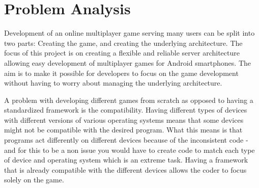 \chapter{Problem Analysis}


Development of an online multiplayer game serving many users can be split into two parts: Creating the game, and creating the underlying architecture. The focus of this project is on creating a flexible and reliable server architecture  allowing easy development of multiplayer games for Android smartphones. The aim is to make it possible for developers to focus on the game development without having to worry about managing the underlying architecture. 

A problem with developing different games from scratch as opposed to having a standardized framework is the compatibility. Having different types of devices with different versions of various operating systems means that some devices might not be compatible with the desired program. What this means is that programs act differently on different devices because of the inconsistent code - and for this to be a non issue you would have to create code to match each type of device and operating system which is an extreme task. Having a framework that is already compatible with the different devices allows the coder to focus solely on the game.



